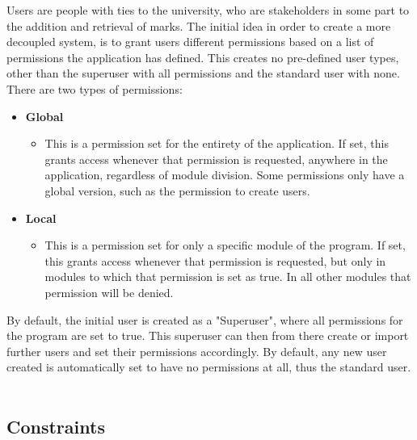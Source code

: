 \documentclass[a4paper,12pt]{article}
\begin{document}
       	Users are people with ties to the university, who are stakeholders in some part to the addition and retrieval of marks. The initial idea in order to create a more decoupled system, is to grant users different permissions based on a list of permissions the application has defined. This creates no pre-defined user types, other than the superuser with all permissions and the standard user with none. There are two types of permissions:
        \begin{itemize}
        	\item \textbf{Global}
        	\begin{itemize}
        		\item This is a permission set for the entirety of the application. If set, this grants access whenever that permission is requested, anywhere in the application, regardless of module division. Some permissions only have a global version, such as the permission to create users.
        	\end{itemize}
        	\item \textbf{Local}
        	\begin{itemize}
        		\item This is a permission set for only a specific module of the program. If set, this grants access whenever that permission is requested, but only in modules to which that permission is set as true. In all other modules that permission will be denied.
        	\end{itemize}
        \end{itemize}
        By default, the initial user is created as a "Superuser", where all permissions for the program are set to true. This superuser can then from there create or import further users and set their permissions accordingly. By default, any new user created is automatically set to have no permissions at all, thus the standard user.\\\\
        
        \subsection{Constraints}
        
\end{document}
